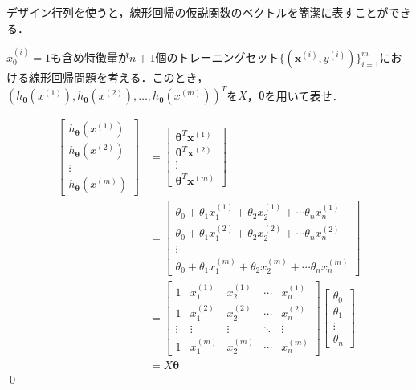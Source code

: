 デザイン行列を使うと，線形回帰の仮説関数のベクトルを簡潔に表すことができる．

\begin{qu}
$x_0^{(i)}=1$も含め特徴量が$n+1$個のトレーニングセット$\{({\bm x}^{(i)},y^{(i)})\}_{i=1}^m$における線形回帰問題を考える．このとき，$(h_{{\bm \theta}}(x^{(1)}),h_{{\bm \theta}}(x^{(2)}),\ldots,h_{{\bm \theta}}(x^{(m)}))^T$を$X$，${\bm \theta}$を用いて表せ．
\end{qu}
\begin{ans}
\begin{align}
\begin{bmatrix}
h_{{\bm \theta}}(x^{(1)}) \\
h_{{\bm \theta}}(x^{(2)}) \\
\vdots \\
h_{{\bm \theta}}(x^{(m)})
\end{bmatrix}
&=
\begin{bmatrix}
{\bm \theta}^T{\bm x}^{(1)} \\
{\bm \theta}^T {\bm x}^{(2)}\\
\vdots \\
{\bm \theta}^T {\bm x}^{(m)}
\end{bmatrix}\nonumber\\
&=
\begin{bmatrix}
\theta_0 +\theta_1 x_1^{(1)}+\theta_2 x_2^{(1)}+\cdots \theta_n x_n^{(1)} \\
\theta_0 +\theta_1 x_1^{(2)}+\theta_2 x_2^{(2)}+\cdots \theta_n x_n^{(2)} \\
\vdots \\
\theta_0 +\theta_1 x_1^{(m)}+\theta_2 x_2^{(m)}+\cdots \theta_n x_n^{(m)} 
\end{bmatrix}\nonumber \\
&=
\begin{bmatrix}
1 & x_1^{(1)} & x_2^{(1)} & \cdots & x_n^{(1)} \\
1 & x_1^{(2)} & x_2^{(2)} & \cdots & x_n^{(2)} \\
\vdots & \vdots & \vdots & \ddots & \vdots \\
1 & x_1^{(m)} & x_2^{(m)} & \cdots & x_n^{(m)} 
\end{bmatrix}
\begin{bmatrix}
\theta_0 \\
\theta_1 \\
\vdots \\
\theta_n
\end{bmatrix}\nonumber \\
&=X {\bm \theta}
\end{align}\qed
\end{ans}

